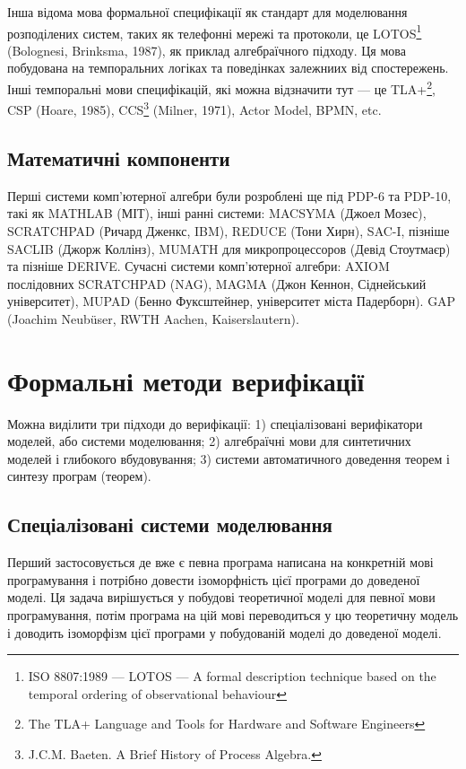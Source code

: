 Інша відома мова формальної специфікації як стандарт
для моделювання розподілених систем, таких як телефонні мережі та протоколи, це
LOTOS\footnote{ISO 8807:1989 --- LOTOS --- A formal description technique based
on the temporal ordering of observational behaviour} (Bolognesi, Brinksma, 1987),
як приклад алгебраїчного підходу.
Ця мова побудована на темпоральних логіках та поведінках залежниих від спостережень.
Інші темпоральні мови специфікацій, які можна відзначити тут --- це TLA+\footnote{The
TLA+ Language and Tools for Hardware and Software Engineers}, CSP (Hoare, 1985),
CCS\footnote{J.C.M. Baeten. A Brief History of Process Algebra.} (Milner, 1971), Actor Model, BPMN, etc.

\subsection{Математичні компоненти}
Перші системи комп'ютерної алгебри були розроблені ще під PDP-6 та PDP-10,
такі як MATHLAB (МІТ), інші ранні системи:
MACSYMA (Джоел Мозес),
SCRATCHPAD (Ричард Дженкс, IBM),
REDUCE (Тони Хирн),
SAC-I, пізніше SACLIB (Джорж Коллінз),
MUMATH для микропроцессоров (Девід Стоутмаєр) та пізніше DERIVE.
Сучасні системи комп'ютерної алгебри:
AXIOM послідовних SCRATCHPAD (NAG),
MAGMA (Джон Кеннон, Сіднейський університет),
MUPAD (Бенно Фуксштейнер, університет міста Падерборн).
GAP (Joachim Neubüser, RWTH Aachen, Kaiserslautern).

\section{Формальні методи верифікації}
Можна виділити три підходи до верифікації:
1) спеціалізовані верифікатори моделей, або системи моделювання;
2) алгебраїчні мови для синтетичних моделей і глибокого вбудовування;
3) системи автоматичного доведення теорем і синтезу програм (теорем).

\subsection{Спеціалізовані системи моделювання}
Перший застосовується де вже є певна програма написана на конкретній мові
програмування і потрібно довести ізоморфність цієї програми до доведеної моделі.
Ця задача вирішується у побудові теоретичної моделі для певної мови програмування,
потім програма на цій мові переводиться у цю теоретичну модель і доводить
ізоморфізм цієї програми у побудованій моделі до доведеної моделі.

